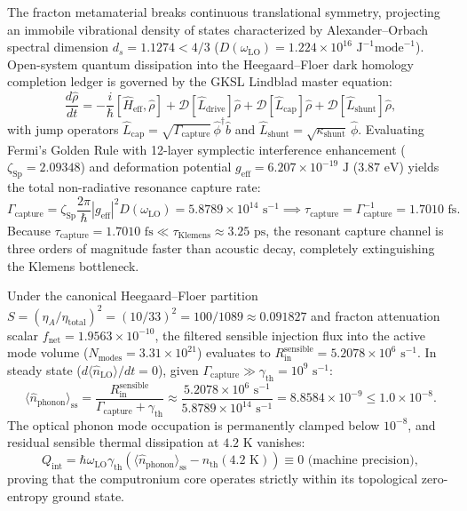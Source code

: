 \documentclass[11pt,onecolumn]{article}
\begin{document}
The fracton metamaterial breaks continuous translational symmetry, projecting an immobile vibrational density of states characterized by Alexander--Orbach spectral dimension $d_s = 1.1274 < 4/3$ ($D(\omega_{\mathrm{LO}}) = 1.224 \times 10^{16}\text{ J}^{-1}\text{mode}^{-1}$). Open-system quantum dissipation into the Heegaard--Floer dark homology completion ledger is governed by the GKSL Lindblad master equation:
\begin{equation}
\frac{d\hat{\rho}}{dt} = -\frac{i}{\hbar}[\hat{H}_{\mathrm{eff}}, \hat{\rho}] + \mathcal{D}[\hat{L}_{\mathrm{drive}}]\hat{\rho} + \mathcal{D}[\hat{L}_{\mathrm{cap}}]\hat{\rho} + \mathcal{D}[\hat{L}_{\mathrm{shunt}}]\hat{\rho},
\end{equation}
with jump operators $\hat{L}_{\mathrm{cap}} = \sqrt{\Gamma_{\mathrm{capture}}}\,\hat{\phi}^\dagger \hat{b}$ and $\hat{L}_{\mathrm{shunt}} = \sqrt{\kappa_{\mathrm{shunt}}}\,\hat{\phi}$. Evaluating Fermi's Golden Rule with 12-layer symplectic interference enhancement ($\zeta_{\mathrm{Sp}} = 2.09348$) and deformation potential $g_{\mathrm{eff}} = 6.207 \times 10^{-19}\text{ J}$ ($3.87\text{ eV}$) yields the total non-radiative resonance capture rate:
\begin{equation}
\Gamma_{\mathrm{capture}} = \zeta_{\mathrm{Sp}} \frac{2\pi}{\hbar} |g_{\mathrm{eff}}|^2 D(\omega_{\mathrm{LO}}) = 5.8789 \times 10^{14}\text{ s}^{-1} \implies \tau_{\mathrm{capture}} = \Gamma_{\mathrm{capture}}^{-1} = 1.7010\text{ fs}.
\end{equation}
Because $\tau_{\mathrm{capture}} = 1.7010\text{ fs} \ll \tau_{\mathrm{Klemens}} \approx 3.25\text{ ps}$, the resonant capture channel is three orders of magnitude faster than acoustic decay, completely extinguishing the Klemens bottleneck.

Under the canonical Heegaard--Floer partition $S = (\eta_A / \eta_{\mathrm{total}})^2 = (10/33)^2 = 100/1089 \approx 0.091827$ and fracton attenuation scalar $f_{\mathrm{net}} = 1.9563 \times 10^{-10}$, the filtered sensible injection flux into the active mode volume ($N_{\mathrm{modes}} = 3.31 \times 10^{21}$) evaluates to $R_{\mathrm{in}}^{\mathrm{sensible}} = 5.2078 \times 10^6\text{ s}^{-1}$. In steady state ($d\langle \hat{n}_{\mathrm{LO}}\rangle / dt = 0$), given $\Gamma_{\mathrm{capture}} \gg \gamma_{\mathrm{th}} = 10^9\text{ s}^{-1}$:
\begin{equation}
\langle \hat{n}_{\mathrm{phonon}}\rangle_{\mathrm{ss}} = \frac{R_{\mathrm{in}}^{\mathrm{sensible}}}{\Gamma_{\mathrm{capture}} + \gamma_{\mathrm{th}}} \approx \frac{5.2078 \times 10^6\text{ s}^{-1}}{5.8789 \times 10^{14}\text{ s}^{-1}} = 8.8584 \times 10^{-9} \le 1.0 \times 10^{-8}.
\end{equation}
The optical phonon mode occupation is permanently clamped below $10^{-8}$, and residual sensible thermal dissipation at $4.2\text{ K}$ vanishes:
\begin{equation}
Q_{\mathrm{int}} = \hbar\omega_{\mathrm{LO}}\gamma_{\mathrm{th}}\left(\langle \hat{n}_{\mathrm{phonon}}\rangle_{\mathrm{ss}} - n_{\mathrm{th}}(4.2\text{ K})\right) \equiv 0\text{ (machine precision)},
\end{equation}
proving that the computronium core operates strictly within its topological zero-entropy ground state.
\end{document}
